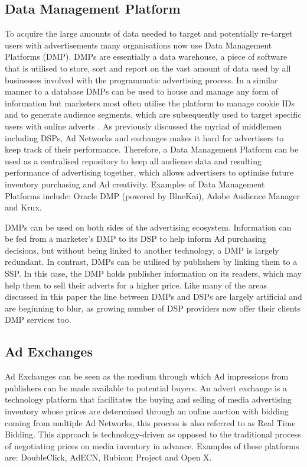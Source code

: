\documentclass[12pt]{article}
\begin{document}
\subsection{Data Management Platform}
To acquire the large amounts of data needed to target and potentially re-target users with advertisements many organisations now use Data Management Platforms (DMP). DMPs are essentially a data warehouse, a piece of software that is utilised to store, sort and report on the vast amount of data used by all businesses involved with the programmatic advertising process. In a similar manner to a database DMPs can be used to house and manage any form of information but marketers most often utilise the platform to manage cookie IDs and to generate audience segments, which are subsequently used to target specific users with online adverts \parencite{DMP}. As previously discussed the myriad of middlemen including DSPs, Ad Networks and exchanges makes it hard for advertisers to keep track of their performance. Therefore, a Data Management Platform can be used as a centralised repository to keep all audience data and resulting performance of advertising together, which allows advertisers to optimise future inventory purchasing and Ad creativity. Examples of Data Management Platforms include: Oracle DMP (powered by BlueKai), Adobe Audience Manager and Krux. \newline

DMPs can be used on both sides of the advertising ecosystem. Information can be fed from a marketer's DMP to its DSP to help inform Ad purchasing decisions, but without being linked to another technology, a DMP is largely redundant. In contrast, DMPs can be 
utilised by publishers by linking them to a SSP. In this case, the DMP holds publisher information on its readers, which may help them to sell their adverts for a higher price. Like many of the areas discussed in this paper the line between DMPs and DSPs are largely artificial and are beginning to blur, as growing number of DSP providers now offer their clients DMP services too.  

\subsection{Ad Exchanges} \label{AdExchanges}
Ad Exchanges can be seen as the medium through which Ad impressions from publishers can be made available to potential buyers. An advert exchange is a technology platform that facilitates the buying and selling of media advertising inventory whose prices are determined through an online auction with bidding coming from multiple Ad Networks, this process is also referred to as Real Time Bidding. This approach is technology-driven as opposed to the traditional process of negotiating prices on media inventory in advance. Examples of these platforms are: DoubleClick, AdECN, Rubicon Project and Open X. \newline
\end{document}
